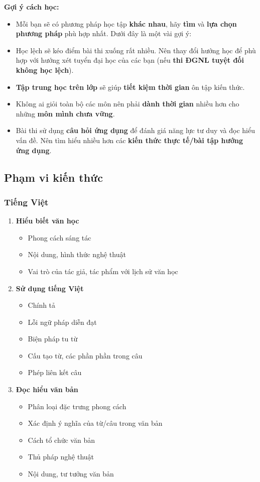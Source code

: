 \textbf{Gợi ý cách học:}
\begin{itemize}
    \item Mỗi bạn sẽ có phương pháp học tập \textbf{khác nhau}, hãy \textbf{tìm} và \textbf{lựa chọn phương pháp} phù hợp nhất. Dưới đây là một vài gợi ý:
    \item Học lệch sẽ kéo điểm bài thi xuống rất nhiều. Nên thay đổi hướng học để phù hợp với hướng xét tuyển đại học của các bạn (nếu \textbf{thi ĐGNL tuyệt đối không học lệch}).
    \item \textbf{Tập trung học trên lớp} sẽ giúp \textbf{tiết kiệm thời gian} ôn tập kiến thức.
    \item Không ai giỏi toàn bộ các môn nên phải \textbf{dành thời gian} nhiều hơn cho những \textbf{môn mình chưa vững}. 
    \item Bài thi sử dụng \textbf{câu hỏi ứng dụng} để đánh giá năng lực tư duy và đọc hiểu vấn đề. Nên tìm hiểu nhiều hơn các \textbf{kiến thức thực tế/bài tập hướng ứng dụng}.
    
\end{itemize}

\subsection{Phạm vi kiến thức}
\label{sec:phamvikienthuc}

\subsubsection{Tiếng Việt}
\begin{enumerate}
\item \textbf{Hiểu biết văn học}
    \begin{itemize}
        \item Phong cách sáng tác
        \item Nội dung, hình thức nghệ thuật
        \item Vai trò của tác giả, tác phẩm với lịch sử văn học
    \end{itemize}
\item \textbf{Sử dụng tiếng Việt}
    \begin{itemize}
        \item Chính tả
        \item Lỗi ngữ pháp diễn đạt
        \item Biện pháp tu từ
        \item Cấu tạo từ, các phần phần trong câu
        \item Phép liên kết câu
    \end{itemize}
\item \textbf{Đọc hiểu văn bản}
    \begin{itemize}
        \item Phân loại đặc trưng phong cách
        \item Xác định ý nghĩa của từ/câu trong văn bản
        \item Cách tổ chức văn bản
        \item Thủ pháp nghệ thuật
        \item Nội dung, tư tưởng văn bản
    \end{itemize}
\end{enumerate}
